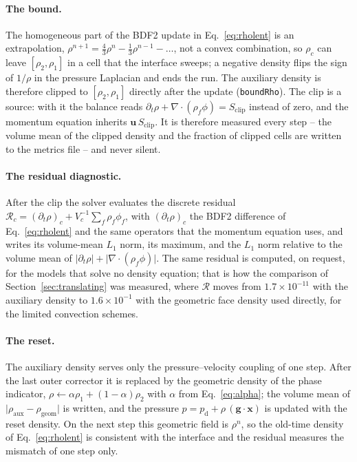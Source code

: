 \documentclass[preprint,3p,11pt]{elsarticle}
\newcommand{\uvec}{\mathbf{u}}
\begin{document}
\paragraph{The bound.} The homogeneous part of the BDF2 update in Eq.~\eqref{eq:rholent}
is an extrapolation, $\rho^{n+1}=\tfrac43\rho^{n}-\tfrac13\rho^{n-1}-\dots$, not a convex
combination, so $\rho_c$ can leave $[\rho_2,\rho_1]$ in a cell that the interface sweeps; a
negative density flips the sign of $1/\rho$ in the pressure Laplacian and ends the run.
The auxiliary density is therefore clipped to $[\rho_2,\rho_1]$ directly after the update
(\texttt{boundRho}). The clip is a source: with it the balance reads
$\partial_t\rho+\nabla\cdot(\rho_f\phi)=S_{\mathrm{clip}}$ instead of zero, and the momentum
equation inherits $\uvec\,S_{\mathrm{clip}}$. It is therefore measured every step -- the
volume mean of the clipped density and the fraction of clipped cells are written to the
metrics file -- and never silent.

\paragraph{The residual diagnostic.} After the clip the solver evaluates the discrete
residual $\mathcal R_c=(\partial_t\rho)_c+V_c^{-1}\sum_f\rho_f\phi_f$, with
$(\partial_t\rho)_c$ the BDF2 difference of Eq.~\eqref{eq:rholent} and the same operators
that the momentum equation uses, and writes its volume-mean $L_1$ norm, its maximum, and
the $L_1$ norm relative to the volume mean of
$\lvert\partial_t\rho\rvert+\lvert\nabla\cdot(\rho_f\phi)\rvert$. The same residual is
computed, on request, for the models that solve no density equation; that is how the
comparison of Section~\ref{sec:translating} was measured, where $\mathcal R$ moves from
$1.7\times10^{-11}$ with the auxiliary density to $1.6\times10^{-1}$ with the geometric
face density used directly, for the limited convection schemes.

\paragraph{The reset.} The auxiliary density serves only the pressure--velocity coupling
of one step. After the last outer corrector it is replaced by the geometric density of the
phase indicator, $\rho\leftarrow\alpha\rho_1+(1-\alpha)\rho_2$ with $\alpha$ from
Eq.~\eqref{eq:alpha}; the volume mean of
$\lvert\rho_{\mathrm{aux}}-\rho_{\mathrm{geom}}\rvert$ is written, and the pressure
$p=p_{\mathrm d}+\rho\,(\mathbf g\cdot\mathbf x)$ is updated with the reset density. On the
next step this geometric field is $\rho^{n}$, so the old-time density of
Eq.~\eqref{eq:rholent} is consistent with the interface and the residual measures the
mismatch of one step only.
\end{document}
